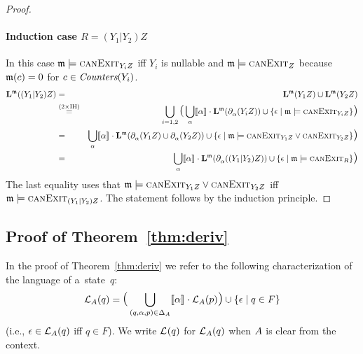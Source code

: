 \begin{proof}
\paragraph{Induction case $R= (Y_1|Y_2)Z$}
In this case $\mem\models\CanExit{Y_iZ}$ iff
$Y_i$ is nullable and $\mem\models\CanExit{Z}$ because
$\mem(c)=0$ for $c\in\COUNTERS{Y_i}$.
\begin{eqnarray*}
  \LANG{\mem}{(Y_1|Y_2)Z} &=& \LANG{\mem}{Y_1Z}\cup \LANG{\mem}{Y_2Z}\\
  &\stackrel{\textrm{($2\times$IH)}}{=}& \bigcup_{i=1,2}\LPAR\bigcup_{\alpha}\den{\alpha}\cdot
  \LANG{\mem}{\CD{\alpha}{Y_iZ}} \cup\{\eps\mid\mem\models\CanExit{Y_iZ}\}\RPAR\\
  &=&
  \bigcup_{\alpha}\den{\alpha}\cdot
  \LANG{\mem}{\CD{\alpha}{Y_1Z}\cup\CD{\alpha}{Y_2Z}} \cup\{\eps\mid\mem\models\CanExit{Y_1Z}\vee\CanExit{Y_2Z}\}\RPAR\\
  &=&
  \bigcup_{\alpha}\den{\alpha}\cdot
  \LANG{\mem}{\CD{\alpha}{(Y_1|Y_2)Z}} \cup\{\eps\mid\mem\models\CanExit{R}\}\RPAR
\end{eqnarray*}
The last equality uses that
$\mem\models\CanExit{Y_1Z}\vee\CanExit{Y_2Z}$ iff
$\mem\models\CanExit{(Y_1|Y_2)Z}$.
The statement follows by the induction principle.
\end{proof}
 
\subsection{Proof of Theorem~\ref{thm:deriv}\label{appThmDeriv}}

In the proof of Theorem~\ref{thm:deriv} we refer to the following characterization of the
language of a~state~$q$: 
%
%
\begin{equation}
\label{eq:Lq}
\Lq[\aut]{q} = \LPAR\bigcup_{({q},{\alpha},{p})\in\Delta_\aut}\den{\alpha}\cdot\Lq[\aut]{p}\RPAR \cup \{\eps\mid q\in F\}
\end{equation}
%
(i.e., $\eps \in \Lq[\aut]{q}$ iff $q \in F$).
We write $\Lq{q}$ for $\Lq[\aut]{q}$ when
$\aut$ is clear from the context.

